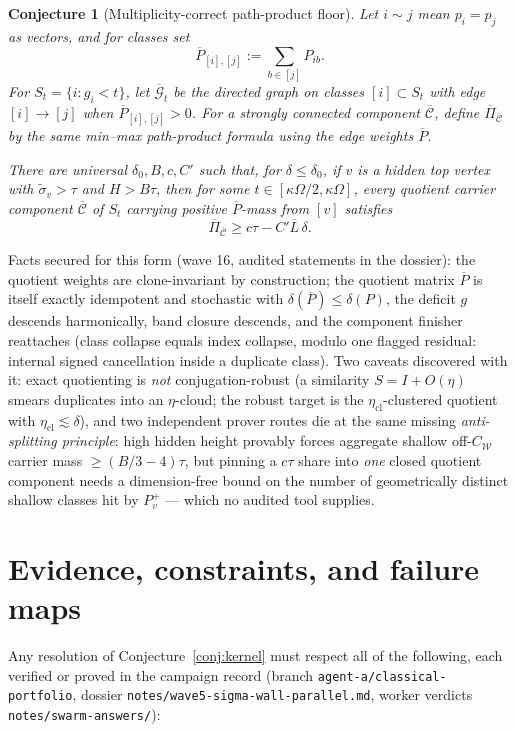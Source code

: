 \documentclass[11pt]{article}
\theoremstyle{plain}
\newtheorem{conjecture}{Conjecture}
\theoremstyle{definition}
\theoremstyle{remark}
\newcommand{\W}{\mathcal W}
\newcommand{\sigt}{\widetilde{\sigma}}
\begin{document}
\begin{conjecture}[Multiplicity-correct path-product floor]\label{conj:quotient-floor}
Let $i\sim j$ mean $p_i=p_j$ as vectors, and for classes set
\[
\overline P_{[i],[j]}:=\sum_{b\in[j]}P_{ib}.
\]
For $S_t=\{i:g_i<t\}$, let $\overline{\mathcal G}_t$ be the directed graph on
classes $[i]\subset S_t$ with edge $[i]\to[j]$ when
$\overline P_{[i],[j]}>0$. For a strongly connected component
$\overline{\mathcal C}$, define $\overline\Pi_{\overline{\mathcal C}}$
by the same min--max path-product formula using the edge weights
$\overline P$.

There are universal $\delta_0,B,c,C'$ such that, for
$\delta\le\delta_0$, if $v$ is a hidden top vertex with
$\sigt_v>\tau$ and $H>B\tau$, then for some
$t\in[\kappa\Omega/2,\kappa\Omega]$, every quotient carrier component
$\overline{\mathcal C}$ of $S_t$ carrying positive $\overline P$-mass
from $[v]$ satisfies
\[
\overline\Pi_{\overline{\mathcal C}}
\ge c\tau-C'\overline L\,\delta .
\]
\end{conjecture}

\noindent Facts secured for this form (wave 16, audited statements in the dossier):
the quotient weights are clone-invariant by construction; the quotient matrix
$\overline P$ is itself exactly idempotent and stochastic with
$\delta(\overline P)\le\delta(P)$, the deficit $g$ descends harmonically, band closure
descends, and the component finisher reattaches (class collapse equals index collapse,
modulo one flagged residual: internal signed cancellation inside a duplicate class).
Two caveats discovered with it: exact quotienting is \emph{not} conjugation-robust
(a similarity $S=I+O(\eta)$ smears duplicates into an $\eta$-cloud; the robust target
is the $\eta_{\mathrm{cl}}$-clustered quotient with
$\eta_{\mathrm{cl}}\lesssim\delta$), and two independent prover routes die at the same
missing \emph{anti-splitting principle}: high hidden height provably forces aggregate
shallow off-$C_{\W}$ carrier mass $\ge(B/3-4)\tau$, but pinning a $c\tau$ share into
\emph{one} closed quotient component needs a dimension-free bound on the number of
geometrically distinct shallow classes hit by $P_v^+$ --- which no audited tool
supplies.

\section{Evidence, constraints, and failure maps}\label{sec:evidence}

Any resolution of Conjecture~\ref{conj:kernel} must respect all of the following, each
verified or proved in the campaign record (branch \texttt{agent-a/classical-portfolio},
dossier \texttt{notes/wave5-sigma-wall-parallel.md}, worker verdicts
\texttt{notes/swarm-answers/}):
\end{document}
